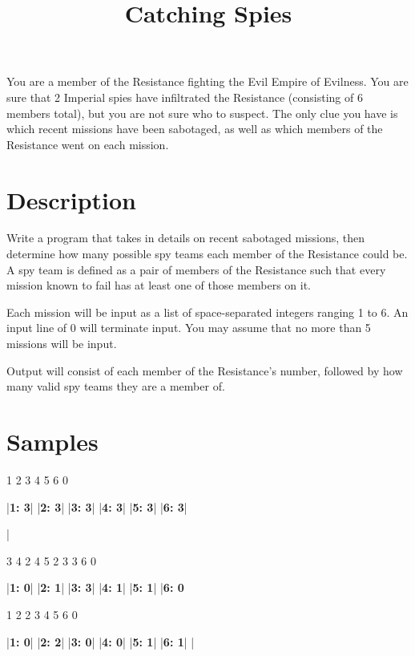 \documentclass{../codeproblem}
\begin{document}
\title{Catching Spies}

\begin{flavor}
You are a member of the Resistance fighting the Evil Empire of Evilness. You are sure that 2 Imperial spies have infiltrated the Resistance (consisting of 6 members total), but you are not sure who to suspect. The only clue you have is which recent missions have been sabotaged, as well as which members of the Resistance went on each mission.
\end{flavor}

\section*{Description}
Write a program that takes in details on recent sabotaged missions, then determine how many possible spy teams each member of the Resistance could be. A spy team is defined as a pair of members of the Resistance such that every mission known to fail has at least one of those members on it.

Each mission will be input as a list of space-separated integers ranging 1 to 6. An input line of 0 will terminate input. You may assume that no more than 5 missions will be input.

Output will consist of each member of the Resistance's number, followed by how many valid spy teams they are a member of.

\section*{Samples}
\begin{minipage}[t]{.33\linewidth}
\begin{example}
1 2 3
4 5 6
0

|\textbf{1: 3}|
|\textbf{2: 3}|
|\textbf{3: 3}|
|\textbf{4: 3}|
|\textbf{5: 3}|
|\textbf{6: 3}|

|\end{example}
\end{minipage}
\begin{minipage}[t]{.33\linewidth}
\begin{example}
3 4
2 4 5
2 3
3 6
0

|\textbf{1: 0}|
|\textbf{2: 1}|
|\textbf{3: 3}|
|\textbf{4: 1}|
|\textbf{5: 1}|
|\textbf{6: 0}\end{example}
\end{minipage}
\begin{minipage}[t]{.33\linewidth}
\begin{example}
1 2
2 3 4
5 6
0

|\textbf{1: 0}|
|\textbf{2: 2}|
|\textbf{3: 0}|
|\textbf{4: 0}|
|\textbf{5: 1}|
|\textbf{6: 1}|
|\end{example}
\end{minipage}
\end{document}
